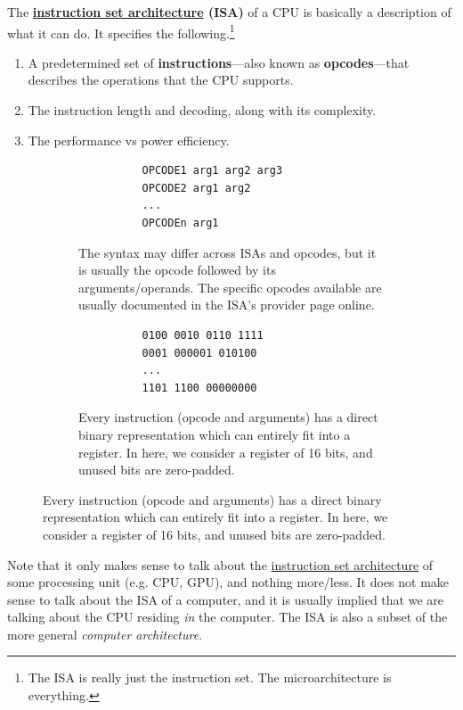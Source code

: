   \begin{definition}
    \label{def:instruction-set-architecture-2}
    The \textbf{\hyperref[def:instruction-set-architecture]{instruction set architecture} (ISA)} of a CPU is basically a description of what it can do. It specifies the following.\footnote{The ISA is really just the instruction set. The microarchitecture is everything. } 
    \begin{enumerate}
      \item A predetermined set of \textbf{instructions}---also known as \textbf{opcodes}---that describes the operations that the CPU supports. 
      \item The instruction length and decoding, along with its complexity. 
      \item The performance vs power efficiency. 
    \end{enumerate}

    \begin{figure}[H]
      \centering
      \begin{subfigure}[b]{0.48\textwidth}
        \centering
        \begin{lstlisting}
          OPCODE1 arg1 arg2 arg3 
          OPCODE2 arg1 arg2
          ...
          OPCODEn arg1 
        \end{lstlisting}
        \caption{The syntax may differ across ISAs and opcodes, but it is usually the opcode followed by its arguments/operands. The specific opcodes available are usually documented in the ISA's provider page online.}
      \end{subfigure}
      \hfill 
      \begin{subfigure}[b]{0.48\textwidth}
        \centering
        \begin{lstlisting}
          0100 0010 0110 1111 
          0001 000001 010100
          ... 
          1101 1100 00000000 
        \end{lstlisting}
        \caption{Every instruction (opcode and arguments) has a direct binary representation which can entirely fit into a register. In here, we consider a register of 16 bits, and unused bits are zero-padded.}
      \end{subfigure}
      \label{fig:isa_syntax}
    \end{figure}
  \end{definition}

  Note that it only makes sense to talk about the \hyperref[def:instruction-set-architecture-2]{instruction set architecture} of some processing unit (e.g. CPU, GPU), and nothing more/less. It does not make sense to talk about the ISA of a computer, and it is usually implied that we are talking about the CPU residing \textit{in} the computer. The ISA is also a subset of the more general \textit{computer architecture}. 

